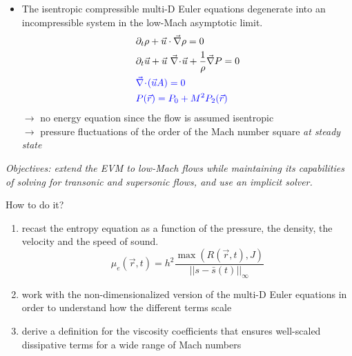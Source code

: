 \documentclass[xcolor=dvipsnames,10pt]{beamer}
\renewcommand{\div}{\vec{\nabla}\! \cdot \!}
\newcommand{\grad}{\vec{\nabla}}
\newcommand{\tcr}[1]{\textcolor{red}{#1}}
\begin{document}
\begin{frame}
\begin{block}{}
\begin{itemize}
\setlength{\itemsep}{10pt}
\item The isentropic compressible multi-D Euler equations degenerate into an incompressible system in the low-Mach asymptotic limit.
\begin{align}
&\partial_t \rho + \vec{u} \cdot \grad \rho = 0 \nonumber \\
&\partial_t \vec{u} + \vec{u}\text{ } \div \vec{u} + \frac{1}{\rho}\grad P = 0 \nonumber \\
&\textcolor{blue}{\div \left( \vec{u}A \right) = 0} \nonumber \\
&\textcolor{blue}{P( \vec{r}) = P_0 + M^2 P_2(\vec{r})}\nonumber
\end{align}
$\to$ no energy equation since the flow is assumed isentropic \\
$\to$ pressure fluctuations of the order of the Mach number square \emph{at steady state}%
\end{itemize}
\end{block}
\end{frame}
\begin{frame}
\emph{Objectives: extend the EVM to low-Mach flows while maintaining its capabilities of solving for transonic and supersonic flows, and use an implicit solver.}
\begin{block}{How to do it?}
\begin{enumerate}
\setlength{\itemsep}{10pt}
\item recast the entropy equation as a function of the pressure, the density, the velocity and the speed of sound.
\begin{equation}
\mu_e(\vec{r},t) = h^2 \frac{\max \left( R(\vec{r},t), J \right)}{|| s - \bar{s}(t) ||_\infty} \nonumber
\end{equation}
\item work with the non-dimensionalized version of the multi-D Euler equations in order to understand how the different terms scale
\item derive a definition for the viscosity coefficients that ensures well-scaled dissipative terms for a wide range of Mach numbers
\end{enumerate}
\end{block}
\end{frame}
\end{document}
